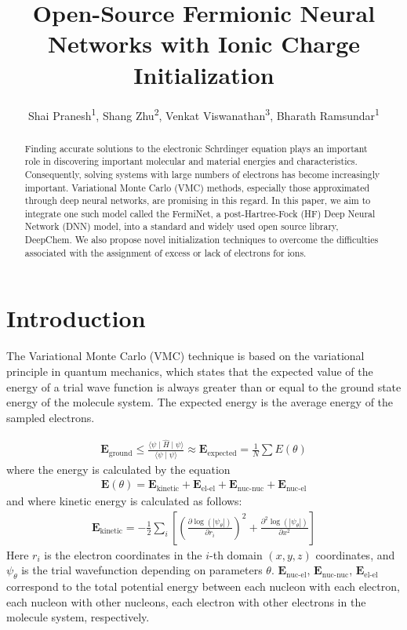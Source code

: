 \documentclass[letterpaper]{article} %
\title{Open-Source Fermionic Neural Networks with Ionic Charge Initialization}
\author{
    Shai Pranesh\textsuperscript{\rm 1},
    Shang Zhu\textsuperscript{\rm 2},
    Venkat Viswanathan\textsuperscript{\rm 3},
    Bharath Ramsundar\textsuperscript{\rm 1}
}
\begin{document}
\maketitle

\begin{abstract}
Finding accurate solutions to the electronic Schrdinger equation plays an important role in discovering important molecular and material energies and characteristics. Consequently, solving systems with large numbers of electrons has become increasingly important. Variational Monte Carlo (VMC) methods, especially those approximated through deep neural networks, are promising in this regard. In this paper, we aim to integrate one such model called the FermiNet, a post-Hartree-Fock (HF) Deep Neural Network (DNN) model, into a standard and widely used open source library, DeepChem. We also propose novel initialization techniques to overcome the difficulties associated with the assignment of excess or lack of electrons for ions.
\end{abstract}

\section{Introduction}

The Variational Monte Carlo (VMC) technique is based on the variational 
principle in quantum mechanics, which states that the expected value of the
energy of a trial wave function is always greater than or equal to the ground 
state energy of the molecule system. The expected energy is the average energy 
of the sampled electrons.

\begin{align}
\textbf{E}_{\text{ground}} \leq \frac{\langle \psi \mid \hat{H} \mid \psi \rangle}{\langle \psi \mid \psi \rangle} \approx \textbf{E}_{\text{expected}} = \frac{1}{N} \sum E(\theta)
\end{align}
\noindent where the energy is calculated by the equation
\begin{align}
\mathbf{E}(\theta) = \mathbf{E}_{\text{kinetic}} + \mathbf{E}_{\text{el-el}} + \mathbf{E}_{\text{nuc-nuc}} + \mathbf{E}_{\text{nuc-el}}
\end{align}
\noindent and where kinetic energy is calculated as follows:
\begin{align}
\mathbf{E}_{\text{kinetic}} = -\frac{1}{2}\sum_{i}\left [ \left(\frac{\partial \log(|\psi_\theta|)}{\partial r_i}\right)^2 + \frac{\partial^2 \log(|\psi_\theta|)}{\partial x^2} \right ]
\end{align}
Here \(r_i\) is the electron coordinates in the \(i\)-th domain $(x, y, z)$ coordinates, and \(\psi_\theta\) is the trial wavefunction depending on parameters $\theta$. \(\mathbf{E}_{\text{nuc-el}}\), \(\mathbf{E}_{\text{nuc-nuc}}\), \(\mathbf{E}_{\text{el-el}}\) correspond to the total potential energy between each nucleon with each electron, each nucleon with other nucleons, each electron with other electrons in the molecule system, respectively.
\end{document}
